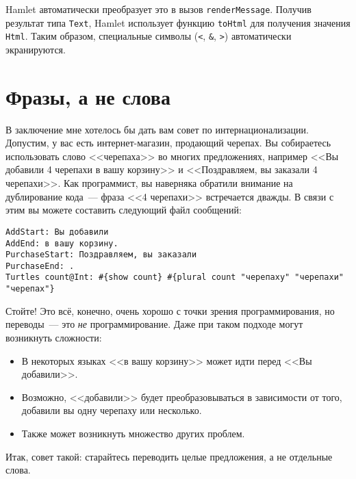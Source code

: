 Hamlet автоматически преобразует это в вызов \lstinline'renderMessage'. Получив
результат типа \lstinline'Text', Hamlet использует функцию \lstinline'toHtml'
для получения значения \lstinline'Html'. Таким образом, специальные символы
(\verb'<', \verb'&', \verb'>') автоматически экранируются.

\section{Фразы, а не слова}

В заключение мне хотелось бы дать вам совет по интернационализации. Допустим, у
вас есть интернет-магазин, продающий черепах. Вы собираетесь использовать слово
<<черепаха>> во многих предложениях, например <<Вы добавили 4 черепахи в вашу
корзину>> и <<Поздравляем, вы заказали 4 черепахи>>. Как программист, вы
наверняка обратили внимание на дублирование кода~--- фраза <<4 черепахи>>
встречается дважды. В связи с этим вы можете составить следующий файл
сообщений:

\begin{lstlisting}
AddStart: Вы добавили
AddEnd: в вашу корзину.
PurchaseStart: Поздравляем, вы заказали
PurchaseEnd: .
Turtles count@Int: #{show count} #{plural count "черепаху" "черепахи" "черепах"}
\end{lstlisting}

Стойте! Это всё, конечно, очень хорошо с точки зрения программирования, но
переводы~--- это \emph{не} программирование. Даже при таком подходе могут
возникнуть сложности:

\begin{itemize}
  \item В некоторых языках <<в вашу корзину>> может идти перед <<Вы добавили>>.

  \item Возможно, <<добавили>> будет преобразовываться в зависимости от того,
      добавили вы одну черепаху или несколько.

  \item Также может возникнуть множество других проблем.
\end{itemize}

Итак, совет такой: старайтесь переводить целые предложения, а не отдельные
слова.
